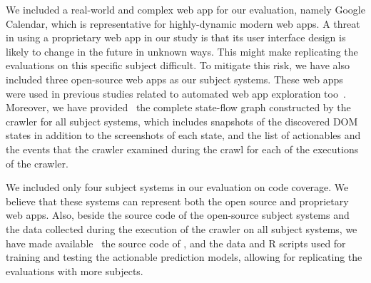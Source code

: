 We included a real-world and complex web app for our evaluation, 
namely Google Calendar,
which is representative for highly-dynamic modern web apps.
A threat in using a proprietary web app in our study is that
its user interface design is likely to change in the future in unknown ways.
This might make replicating the evaluations on this specific subject difficult.
To mitigate this risk, 
we have also included three open-source \js web apps as our subject systems.
These web apps were used in previous studies
related to automated web app exploration too~\cite{artzi2011framework, MilaniFard:2013:FeedEx}.
Moreover, we have provided~\cite{experimental-data} the complete state-flow graph
constructed by the crawler
for all subject systems,
which includes snapshots of the discovered DOM states
in addition to the screenshots of each state,
and the list of actionables and the events that the crawler examined during the crawl
for each of the executions of the crawler.

We included only four subject systems in our evaluation
on \js code coverage.
We believe that these systems can represent both the open source and proprietary web apps.
Also, beside the source code of the open-source subject systems
and the data collected during the execution of the crawler on all subject systems,
we have made available~\cite{experimental-data} the source code of \toolName,
and
the data and R scripts used for training and testing the actionable prediction models,
allowing for replicating the evaluations with more subjects.

